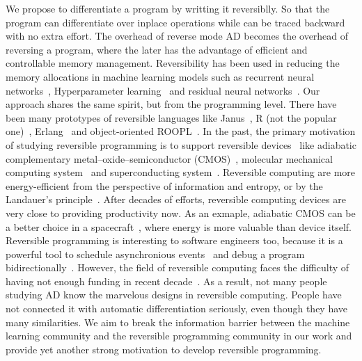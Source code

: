 \documentclass{article}
\newcommand{\<}{\langle}
\renewcommand{\>}{\rangle}
\theoremstyle{definition}\newtheorem{definition}{\textit{Definition}}
\begin{document}
    We propose to differentiate a program by writting it reversiblly. So that the program can differentiate over inplace operations while can be traced backward with no extra effort. The overhead of reverse mode AD becomes the overhead of reversing a program, where the later has the advantage of efficient and controllable memory management. Reversibility has been used in reducing the memory allocations in machine learning models such as recurrent neural networks~\cite{MacKay2018}, Hyperparameter learning~\cite{Maclaurin2015} and residual neural networks~\cite{Behrmann2018}. Our approach shares the same spirit, but from the programming level.
There have been many prototypes of reversible languages like Janus~\cite{Lutz1986}, R (not the popular one)~\cite{Frank1997}, Erlang~\cite{Lanese2018} and object-oriented ROOPL~\cite{Haulund2017}. %
    In the past, the primary motivation of studying reversible programming is to support reversible devices~\cite{Frank1999} like adiabatic complementary metal–oxide–semiconductor (CMOS)~\cite{Koller1992}, molecular mechanical computing system~\cite{Merkle2018} and superconducting system~\cite{Likharev1977,Semenov2003}.
    Reversible computing are more energy-efficient from the perspective of information and entropy, or by the Landauer's principle~\cite{Landauer1961}.
    After decades of efforts, reversible computing devices are very close to providing productivity now. As an exmaple, adiabatic CMOS can be a better choice in a spacecraft~\cite{Hanninen2014, Debenedictis2017}, where energy is more valuable than device itself.
    Reversible programming is interesting to software engineers too, because it is a powerful tool to schedule asynchronious events~\cite{Jefferson1985} and debug a program bidirectionally~\cite{Boothe2000}.
    However, the field of reversible computing faces the difficulty of having not enough funding in recent decade~\cite{Frank2017}. As a result, not many people studying AD know the marvelous designs in reversible computing. People have not connected it with automatic differentiation seriously, even though they have many similarities. We aim to break the information barrier between the machine learning community and the reversible programming community in our work and provide yet another strong motivation to develop reversible programming.
\end{document}
